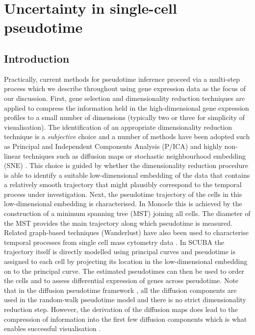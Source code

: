 \chapter{Uncertainty in single-cell pseudotime}\label{ch:pseudogpchap}

\section{Introduction}

Practically, current methods for pseudotime inference proceed via a multi-step process which we describe throughout using gene expression data as the focus of our discussion. First, gene selection and dimensionality reduction techniques are applied to compress the information held in the high-dimensional gene expression profiles to a small number of dimensions (typically two or three for simplicity of visualisation). The identification of an appropriate dimensionality reduction technique is a \emph{subjective} choice and a number of methods have been adopted such as Principal and Independent Components Analysis (P/ICA) and highly non-linear techniques such as diffusion maps \cite{Haghverdi2015,haghverdi2016diffusion} or stochastic neighbourhood embedding (SNE) \cite{hinton2002stochastic,van2008visualizing,Amir2013}. This choice is guided by whether the dimensionality reduction procedure is able to identify a suitable low-dimensional embedding of the data that contains a relatively smooth trajectory that might plausibly correspond to the temporal process under investigation.
Next, the pseudotime trajectory of the cells in this low-dimensional embedding is characterised. In Monocle \cite{Trapnell2014} this is achieved by the construction of a minimum spanning tree (MST) joining all cells. The diameter of the MST provides the main trajectory along which pseudotime is measured. Related graph-based techniques (Wanderlust) have also been used to characterise temporal processes from single cell mass cytometry data \cite{Bendall2014}. In SCUBA \cite{Marco2014} the trajectory itself is directly modelled using principal curves \cite{Hastie2012} and pseudotime is assigned to each cell by projecting its location in the low-dimensional embedding on to the principal curve. The estimated pseudotimes can then be used to order the cells and to assess differential expression of genes across pseudotime. Note that in the diffusion pseudotime framework \cite{haghverdi2016diffusion}, all the diffusion components are used in the random-walk pseudotime model and there is no strict dimensionality reduction step. However, the derivation of the diffusion maps does lead to the compression of information into the first few diffusion components which is what enables successful visualisation \cite{Haghverdi2015}.

